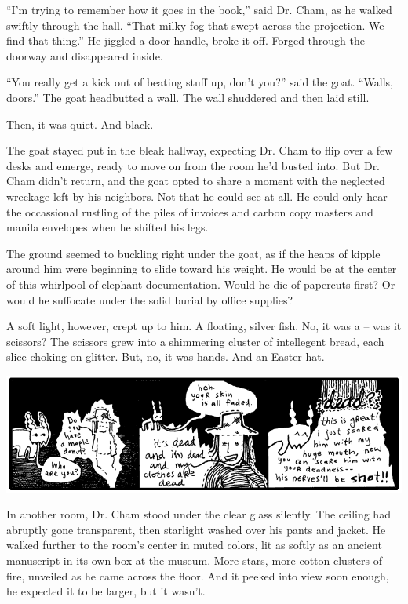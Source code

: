 \documentclass[10pt,twoside]{report}
\begin{document}
``I'm trying to remember how it goes in the book,'' said Dr. Cham, as
he walked swiftly through the hall.  ``That milky fog that swept
across the projection.  We find that thing.''  He jiggled a door
handle, broke it off.  Forged through the doorway and disappeared
inside.

``You really get a kick out of beating stuff up, don't you?'' said the
goat.  ``Walls, doors.'' The goat headbutted a wall.  The wall
shuddered and then laid still.

Then, it was quiet.  And black.

The goat stayed put in the bleak hallway, expecting Dr. Cham to flip
over a few desks and emerge, ready to move on from the room he'd
busted into.  But Dr. Cham didn't return, and the goat opted to share
a moment with the neglected wreckage left by his neighbors.  Not that
he could see at all. He could only hear the occassional rustling of
the piles of invoices and carbon copy masters and manila envelopes
when he shifted his legs.

The ground seemed to buckling right under the goat, as if the heaps of
kipple around him were beginning to slide toward his weight.  He would
be at the center of this whirlpool of elephant documentation.  Would
he die of papercuts first?  Or would he suffocate under the solid
burial by office supplies?

A soft light, however, crept up to him.  A floating, silver fish.  No,
it was a -- was it scissors? The scissors grew into a shimmering
cluster of intellegent bread, each slice choking on glitter. But, no,
it was hands.  And an Easter hat.

	\includegraphics[width=1.0\textwidth]{cache/48.png}

In another room, Dr. Cham stood under the clear glass silently.  The
ceiling had abruptly gone transparent, then starlight washed over his
pants and jacket.  He walked further to the room's center in muted
colors, lit as softly as an ancient manuscript in its own box at the
museum.  More stars, more cotton clusters of fire, unveiled as he came
across the floor. And it peeked into view soon enough, he expected it
to be larger, but it wasn't.
\end{document}
